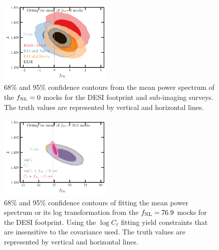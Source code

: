 \begin{figure}
    \centering
    \includegraphics[width=0.48\textwidth]{figures/mcmc_zero.pdf} 
    \caption{68\% and 95\% confidence contours from the mean power spectrum of the $f_{\rm NL}=0$ mocks for the DESI footprint and sub-imaging surveys. The truth values are represented by vertical and horizontal lines.}\label{fig:mcmc_mocks0}
\end{figure}

\begin{figure}
    \centering
    \includegraphics[width=0.48\textwidth]{figures/mcmc_po100.pdf} 
    \caption{68\% and 95\% confidence contours of fitting the mean power spectrum or its log transformation from the $f_{\rm NL}=76.9$ mocks for the DESI footprint. Using the $\log C_{\ell}$ fitting yield constraints that are insensitive to the covariance used. The truth values are represented by vertical and horizontal lines.}\label{fig:mcmc_mocks100}
\end{figure}

